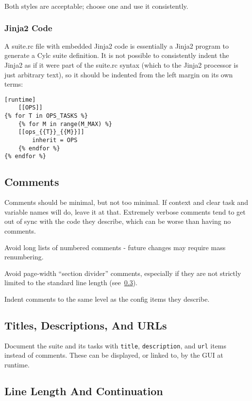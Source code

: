 Both styles are acceptable; choose one and use it consistently.

\subsubsection{Jinja2 Code}

A suite.rc file with embedded Jinja2 code is essentially a Jinja2 program to
generate a Cylc suite definition. It is not possible to consistently indent the
Jinja2 as if it were part of the suite.rc syntax (which to the Jinja2 processor
is just arbitrary text), so it should be indented from the left margin on
its own terms:

\lstset{language=suiterc}
\begin{lstlisting}
[runtime]
    [[OPS]]
{% for T in OPS_TASKS %}
    {% for M in range(M_MAX) %}
    [[ops_{{T}}_{{M}}]]
        inherit = OPS
    {% endfor %}
{% endfor %}
\end{lstlisting}

\subsection{Comments}

Comments should be minimal, but not too minimal. If context and clear
task and variable names will do, leave it at that. Extremely verbose comments
tend to get out of sync with the code they describe, which can be worse
than having no comments.

Avoid long lists of numbered comments - future changes may require mass
renumbering.

Avoid page-width ``section divider'' comments, especially if they are not
strictly limited to the standard line length (see~\ref{Line Length}).

Indent comments to the same level as the config items they describe.

\subsection{Titles, Descriptions, And URLs}

Document the suite and its tasks with \lstinline=title=,
\lstinline=description=, and \lstinline=url= items instead of comments. These
can be displayed, or linked to, by the GUI at runtime.

\subsection{Line Length And Continuation}
\label{Line Length}

